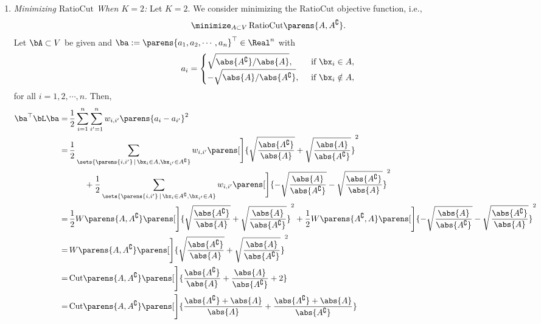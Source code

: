 \documentclass[12pt]{article}
\begin{document}
\begin{enumerate}[label=\textbf{\arabic*.}]
\begin{enumerate}
		\item \textit{Minimizing $\mathrm{RatioCut}$ When $K = 2$:} Let $K = 2$. We consider minimizing the $\mathrm{RatioCut}$ objective function, i.e., 
		\begin{align}\label{eq-ratiocur-k=2}
			\minimize_{A \subset V} \, \mathrm{RatioCut} \parens{A, A^{\complement}}. 
		\end{align}
		Let $\bA \subset V$ be given and $\ba := \parens{a_1, a_2, \cdots, a_n}^\top \in \Real^n$ with 
		\begin{align}\label{eq-vector-comp-ratiocut-k=2}
			a_i = \begin{cases}
			\sqrt{\abs{A^{\complement}} / \abs{A}}, & \, \text{ if } \bx_i \in A, \\ 
			- \sqrt{\abs{A} / \abs{A^{\complement}}}, & \, \text{ if } \bx_i \notin A, 
			\end{cases}
		\end{align}
		for all $i = 1, 2, \cdots, n$. Then, 
		\begin{align*}
			\ba^\top \bL \ba = & \, \frac{1}{2} \sum_{i=1}^n \sum_{i'=1}^n w_{i, i'} \parens{a_i - a_{i'}}^2 \\ 
			= & \, \frac{1}{2} \sum_{\sets{\parens{i, i'} \,\vert\, \bx_i \in A, \bx_{i'} \in A^{\complement}}} w_{i, i'} \parens[\Bigg]{\sqrt{\frac{\abs{A^{\complement}}}{\abs{A}}} + \sqrt{\frac{\abs{A} }{\abs{A^{\complement}}}}}^2 \\ 
			& \qquad + \frac{1}{2} \sum_{\sets{\parens{i, i'} \,\vert\, \bx_i \in A^{\complement}, \bx_{i'} \in A}} w_{i, i'} \parens[\Bigg]{- \sqrt{\frac{\abs{A} }{\abs{A^{\complement}}}} - \sqrt{\frac{\abs{A^{\complement}}}{\abs{A}}} }^2 \\
			= & \, \frac{1}{2} W \parens{A, A^{\complement}} \parens[\Bigg]{\sqrt{\frac{\abs{A^{\complement}}}{\abs{A}}} + \sqrt{\frac{\abs{A} }{\abs{A^{\complement}}}}}^2 + \frac{1}{2} W \parens{A^{\complement}, A} \parens[\Bigg]{ - \sqrt{\frac{\abs{A} }{\abs{A^{\complement}}}}  - \sqrt{\frac{\abs{A^{\complement}}}{\abs{A}}}}^2 \\ 
			= & \, W \parens{A, A^{\complement}} \parens[\Bigg]{\sqrt{\frac{\abs{A^{\complement}}}{\abs{A}}} + \sqrt{\frac{\abs{A} }{\abs{A^{\complement}}}}}^2 \\ 
			= & \, \mathrm{Cut} \parens{A, A^{\complement}} \parens[\Bigg]{\frac{\abs{A^{\complement}}}{\abs{A}} + \frac{\abs{A} }{\abs{A^{\complement}}} + 2}  \\ 
			= & \, \mathrm{Cut} \parens{A, A^{\complement}} \parens[\Bigg]{\frac{\abs{A^{\complement}} + \abs{A}}{\abs{A}} + \frac{\abs{A^{\complement}} + \abs{A} }{\abs{A^{\complement}}}}  \\ 

\end{align*}
\end{enumerate}
\end{enumerate}
\end{document}
